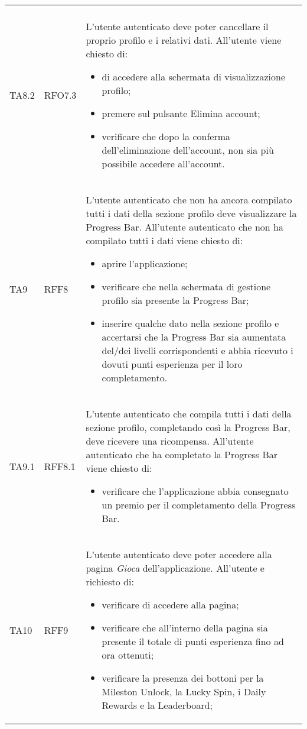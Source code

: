 \begin{longtable}{ >{\centering}p{} >{\centering}p{} >{\centering}p{}
			}
\begin{itemize}
		 \end{itemize}		\tabularnewline
		 TA8.2 & RFO7.3 	&	L'utente autenticato deve poter cancellare il proprio profilo e i relativi dati. All'utente viene chiesto di:
		 \begin{itemize}
		 	\item di accedere alla schermata di visualizzazione profilo;
		 	\item premere sul pulsante Elimina account;
		 	\item verificare che dopo la conferma dell'eliminazione dell'account, non sia più possibile accedere all'account.
		 \end{itemize}		\tabularnewline
		 TA9 & RFF8	&	L'utente autenticato che non ha ancora compilato tutti i dati della sezione profilo deve visualizzare la Progress Bar. All'utente autenticato che non ha compilato tutti i dati viene chiesto di:
		 \begin{itemize}
		 	\item aprire l'applicazione;
		 	\item verificare che nella schermata di gestione profilo sia presente la Progress Bar;
		 	\item inserire qualche dato nella sezione profilo e accertarsi che la Progress Bar sia aumentata del/dei livelli corrispondenti e abbia ricevuto i dovuti punti esperienza per il loro completamento.
		 \end{itemize}		\tabularnewline
		 TA9.1	& RFF8.1 &	L'utente autenticato che compila tutti i dati della sezione profilo, completando così la Progress Bar, deve ricevere una ricompensa. All'utente autenticato che ha completato la Progress Bar viene chiesto di:
		 \begin{itemize}
		 	\item verificare che l'applicazione abbia consegnato un premio per il completamento della Progress Bar.
		 \end{itemize}		\tabularnewline
		 TA10	& RFF9 &	L'utente autenticato deve poter accedere alla pagina \textit{Gioca} dell'applicazione. All'utente e richiesto di:
		 \begin{itemize}
		 	\item verificare di accedere alla pagina;
		 	\item verificare che all'interno della pagina sia presente il totale di punti esperienza fino ad ora ottenuti;
		 	\item verificare la presenza dei bottoni per la Mileston Unlock, la Lucky Spin, i Daily Rewards e la Leaderboard;
		 \end{itemize}		\tabularnewline

\end{longtable}
